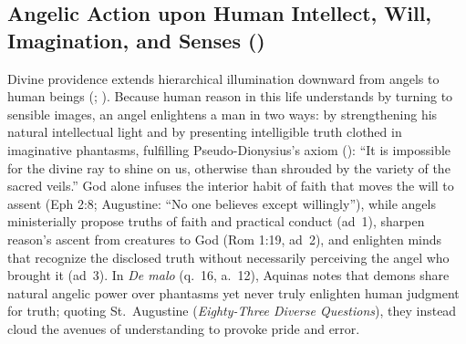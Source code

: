 
\subsection{Angelic Action upon Human Intellect, Will, Imagination, and Senses ()}

Divine providence extends hierarchical illumination downward from angels to human beings (; ). Because human reason in this life understands by turning to sensible images, an angel enlightens a man in two ways: by strengthening his natural intellectual light and by presenting intelligible truth clothed in imaginative phantasms, fulfilling Pseudo-Dionysius's axiom (): ``It is impossible for the divine ray to shine on us, otherwise than shrouded by the variety of the sacred veils.'' God alone infuses the interior habit of faith that moves the will to assent (Eph 2:8; Augustine: ``No one believes except willingly''), while angels ministerially propose truths of faith and practical conduct (ad~1), sharpen reason's ascent from creatures to God (Rom 1:19, ad~2), and enlighten minds that recognize the disclosed truth without necessarily perceiving the angel who brought it (ad~3). In \emph{De malo} (q.~16, a.~12), Aquinas notes that demons share natural angelic power over phantasms yet never truly enlighten human judgment for truth; quoting St.~Augustine (\emph{Eighty-Three Diverse Questions}), they instead cloud the avenues of understanding to provoke pride and error.

